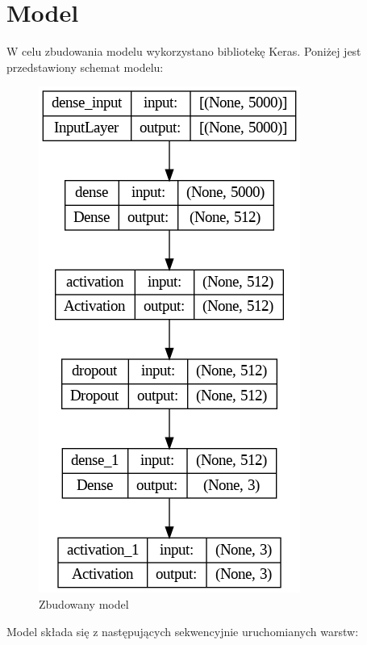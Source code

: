 \documentclass{article}
\begin{document}
\newpage   
\section{Model}

\noindent W celu zbudowania modelu wykorzystano bibliotekę Keras. Poniżej jest przedstawiony schemat modelu:


\begin{figure}[H]
\centering
\includegraphics[scale=0.65]{assets/model.png}
\caption{Zbudowany model}
\label{fig:photo}
\end{figure}


\noindent Model składa się z następujących sekwencyjnie uruchomianych warstw:

\end{document}
